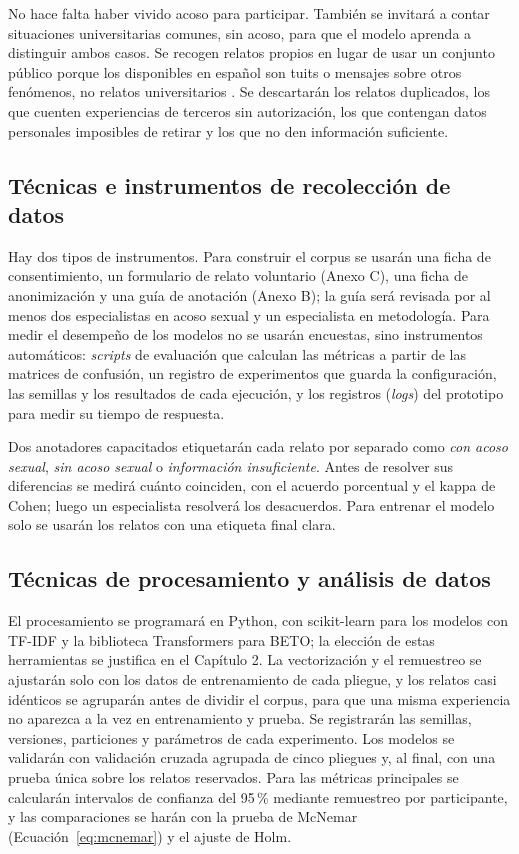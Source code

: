 No hace falta haber vivido acoso para participar. También se invitará a contar situaciones universitarias comunes, sin acoso, para que el modelo aprenda a distinguir ambos casos. Se recogen relatos propios en lugar de usar un conjunto público porque los disponibles en español son tuits o mensajes sobre otros fenómenos, no relatos universitarios \citep{rodriguez2021exist, escobar2022}. Se descartarán los relatos duplicados, los que cuenten experiencias de terceros sin autorización, los que contengan datos personales imposibles de retirar y los que no den información suficiente.

\subsection{Técnicas e instrumentos de recolección de datos}
Hay dos tipos de instrumentos. Para construir el corpus se usarán una ficha de consentimiento, un formulario de relato voluntario (Anexo C), una ficha de anonimización y una guía de anotación (Anexo B); la guía será revisada por al menos dos especialistas en acoso sexual y un especialista en metodología. Para medir el desempeño de los modelos no se usarán encuestas, sino instrumentos automáticos: \textit{scripts} de evaluación que calculan las métricas a partir de las matrices de confusión, un registro de experimentos que guarda la configuración, las semillas y los resultados de cada ejecución, y los registros (\textit{logs}) del prototipo para medir su tiempo de respuesta.

Dos anotadores capacitados etiquetarán cada relato por separado como \textit{con acoso sexual}, \textit{sin acoso sexual} o \textit{información insuficiente}. Antes de resolver sus diferencias se medirá cuánto coinciden, con el acuerdo porcentual y el kappa de Cohen; luego un especialista resolverá los desacuerdos. Para entrenar el modelo solo se usarán los relatos con una etiqueta final clara.

\subsection{Técnicas de procesamiento y análisis de datos}
El procesamiento se programará en Python, con scikit-learn \citep{pedregosa2011} para los modelos con TF-IDF y la biblioteca Transformers \citep{wolf2020} para BETO; la elección de estas herramientas se justifica en el Capítulo 2. La vectorización y el remuestreo se ajustarán solo con los datos de entrenamiento de cada pliegue, y los relatos casi idénticos se agruparán antes de dividir el corpus, para que una misma experiencia no aparezca a la vez en entrenamiento y prueba. Se registrarán las semillas, versiones, particiones y parámetros de cada experimento. Los modelos se validarán con validación cruzada agrupada de cinco pliegues y, al final, con una prueba única sobre los relatos reservados. Para las métricas principales se calcularán intervalos de confianza del 95\,\% mediante remuestreo por participante, y las comparaciones se harán con la prueba de McNemar (Ecuación~\ref{eq:mcnemar}) y el ajuste de Holm.

